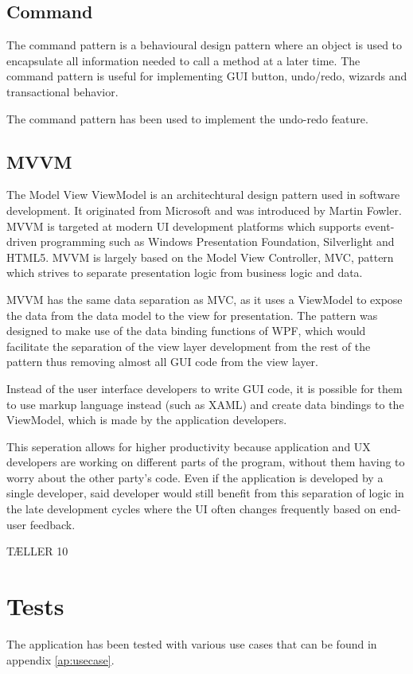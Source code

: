 \subsection{Command}
The command pattern is a behavioural design pattern where an object is used to encapsulate all information needed to call a method at a later time.
The command pattern is useful for implementing GUI button, undo/redo, wizards and transactional behavior.

The command pattern has been used to implement the undo-redo feature.

\subsection{MVVM}
The Model View ViewModel is an architechtural design pattern used in software development. It originated from Microsoft and was introduced by Martin Fowler.
MVVM is targeted at modern UI development platforms which supports event-driven programming such as Windows Presentation Foundation, Silverlight and HTML5.
MVVM is largely based on the Model View Controller, MVC, pattern which strives to separate presentation logic from business logic and data.

MVVM has the same data separation as MVC, as it uses a ViewModel to expose the data from the data model to the view for presentation.
The pattern was designed to make use of the data binding functions of WPF, which would facilitate the separation of the view layer development
from the rest of the pattern thus removing almost all GUI code from the view layer.

Instead of the user interface developers to write GUI code, it is possible for them to use markup language instead (such as XAML)
and create data bindings to the ViewModel, which is made by the application developers.

This seperation allows for higher productivity because application and UX developers are working on different parts of the program, 
without them having to worry about the other party's code.
Even if the application is developed by a single developer, said developer would still benefit from this separation of logic 
in the late development cycles where the UI often changes frequently based on end-user feedback.

TÆLLER 10


\section{Tests}
\label{sec:tests}

The application has been tested with various use cases that can be found in appendix \ref{ap:usecase}.
